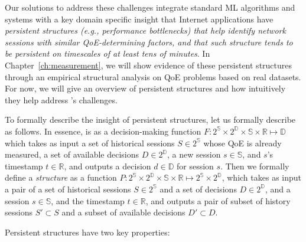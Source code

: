 
Our solutions to address these challenges integrate 
standard ML algorithms and 
systems with a key domain specific insight that Internet
applications have {\em persistent structures
(e.g., performance bottlenecks) that help identify 
network sessions with 
similar QoE-determining factors, and that such 
structure tends to be persistent on timescales of 
at least tens of minutes}.
In Chapter~\ref{ch:measurement}, we will show evidence of these persistent
structures through an empirical structural analysis on  QoE
problems based on real datasets.
For now, we will give an overview of persistent structures 
and how intuitively they help address \ddn's challenges.

To formally describe the insight of persistent structures, 
let us formally describe \ddn as follows. In essence, \ddn is as 
a decision-making function
$F:2^\mathbb{S}\times2^\mathbb{D}\times\mathbb{S}\times\mathbb{R}
\mapsto\mathbb{D}$ which takes as input a set of historical 
sessions $S\in2^\mathbb{S}$ whose 
QoE is already measured, a set of available decisions 
$D\in2^\mathbb{D}$, a new session $s\in\mathbb{S}$, and $s$'s timestamp
$t\in\mathbb{R}$,
and outputs a decision $d\in\mathbb{D}$ for session $s$.
Then we formally define a {\em structure} as
a function 
$P:2^\mathbb{S}\times2^\mathbb{D}\times\mathbb{S}\times\mathbb{R}
\mapsto2^\mathbb{S}\times2^\mathbb{D}$,
which takes as input a pair of a set of historical 
sessions $S\in2^\mathbb{S}$ and a set of decisions $D\in2^\mathbb{D}$,
and a session $s\in\mathbb{S}$, and the timestamp
$t\in\mathbb{R}$, and outputs a pair of  subset of history sessions
$S'\subset{S}$ and a  subset of available decisions $D'\subset{D}$.



Persistent structures have two key properties:

